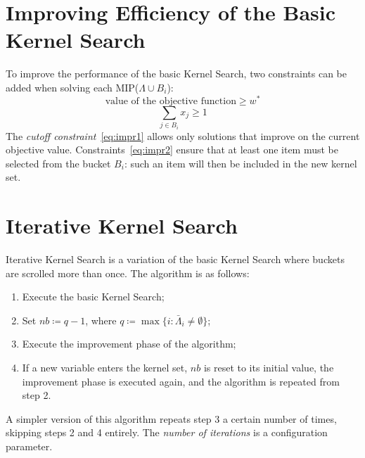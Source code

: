 \section{Improving Efficiency of the Basic Kernel Search}\label{sec:improving-efficiency}
To improve the performance of the basic Kernel Search, two constraints can be added
when solving each MIP(\(\Lambda \cup B_{i}\)):
\begin{equation}
    \label{eq:impr1}
    \text{value of the objective function} \geq w^{*}
\end{equation}
\begin{equation}
    \label{eq:impr2}
    \sum_{j \in B_{i}} x_{j} \geq 1
\end{equation}
The \textit{cutoff constraint}~\eqref{eq:impr1} allows only solutions that improve on the current
objective value.
Constraints~\eqref{eq:impr2} ensure that at least one item must be selected from the bucket \(B_{i}\):
such an item will then be included in the new kernel set.


\section{Iterative Kernel Search}\label{sec:iter}
Iterative Kernel Search is a variation of the basic Kernel Search where buckets are scrolled more than once.
The algorithm is as follows:
\begin{enumerate}
    \item Execute the basic Kernel Search;
    \item Set \(nb \coloneqq q-1\), where \(q \coloneqq \max\{i:\bar{\Lambda}_{i} \neq \emptyset\}\);
    \item Execute the improvement phase of the algorithm;
    \item If a new variable enters the kernel set, \(nb\) is reset to its initial value,
    the improvement phase is executed again, and the algorithm is repeated from step 2.
\end{enumerate}

A simpler version of this algorithm repeats step 3 a certain number of times,
skipping steps 2 and 4 entirely.
The \textit{number of iterations} is a configuration parameter.